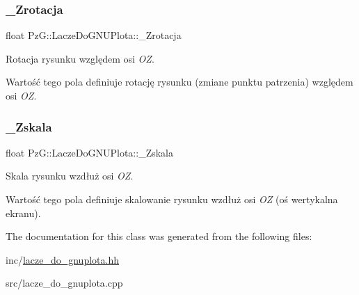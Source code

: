 \subsubsection{\texorpdfstring{\_Zrotacja}{\_Zrotacja}}
{\footnotesize\ttfamily float Pz\+G\+::\+Lacze\+Do\+G\+N\+U\+Plota\+::\+\_\+\+Zrotacja\hspace{0.3cm}{\ttfamily [protected]}}



Rotacja rysunku względem osi {\itshape OZ}. 

Wartość tego pola definiuje rotację rysunku (zmiane punktu patrzenia) względem osi {\itshape OZ}. \mbox{\label{class_pz_g_1_1_lacze_do_g_n_u_plota_a85446d06b2d714b2f852ef43c47c73c1}} 
\subsubsection{\texorpdfstring{\_Zskala}{\_Zskala}}
{\footnotesize\ttfamily float Pz\+G\+::\+Lacze\+Do\+G\+N\+U\+Plota\+::\+\_\+\+Zskala\hspace{0.3cm}{\ttfamily [protected]}}



Skala rysunku wzdłuż osi {\itshape OZ}. 

Wartość tego pola definiuje skalowanie rysunku wzdłuż osi {\itshape OZ} (oś wertykalna ekranu). 

The documentation for this class was generated from the following files\+:\begin{DoxyCompactItemize}
\item 
inc/\mbox{\hyperlink{lacze__do__gnuplota_8hh}{lacze\+\_\+do\+\_\+gnuplota.\+hh}}\item 
src/lacze\+\_\+do\+\_\+gnuplota.\+cpp\end{DoxyCompactItemize}
